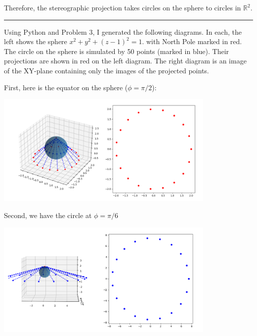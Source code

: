 \documentclass[12pt]{article}
\newcommand{\R}{\mathbb{R}}
\begin{document}
        Therefore, the stereographic projection takes circles on the sphere to circles in $\R^2$.
        
        \vspace*{10pt}
        \hrule 
        \vspace*{10pt}

        Using Python and Problem 3, I generated the following diagrams. In each, the left shows the sphere $x^{2} + y^{2} + (z-1)^{2} = 1$. with North Pole marked in red. The circle on the sphere is simulated by 50 points (marked in blue). Their projections are shown in red on the left diagram. The right diagram is an image of the XY-plane containing only the images of the projected points. 

        First, here is the equator on the sphere ($\phi = \pi/2$): 
        \begin{center}
        \includegraphics[width=0.8\textwidth]{Images/equator.png}
        \end{center}

        Second, we have the circle at $\phi = \pi/6$ 
        \begin{center}
        \includegraphics[width=0.8\textwidth]{Images/pi6 latitude.png}
        \end{center}
\end{document}
